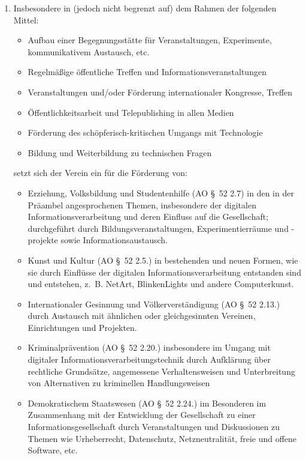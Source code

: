 \documentclass[10pt,a4paper]{scrartcl}
\begin{document}
\begin{enumerate}
\item Insbesondere in (jedoch nicht begrenzt auf) dem Rahmen der folgenden Mittel:
	\begin{itemize}
        \item Aufbau einer Begegnungsst{\"a}tte f{\"u}r Veranstaltungen, Experimente, kommunikativem Austausch, etc.
		\item Regelm{\"a}{\ss}ige {\"o}ffentliche Treffen und Informationsveranstaltungen
		\item Veranstaltungen und/oder F{\"o}rderung internationaler Kongresse, Treffen
		\item {\"O}ffentlichkeitsarbeit und Telepublishing in allen Medien
		\item F{\"o}rderung des sch{\"o}pferisch-kritischen Umgangs mit Technologie
        \item Bildung und Weiterbildung zu technischen Fragen
	\end{itemize}
	setzt sich der Verein ein f{\"u}r die F{\"o}rderung von:
	\begin{itemize}
		\item Erziehung, Volksbildung und Studentenhilfe (AO \S \ 52 2.7) in den in der Pr{\"a}ambel angesprochenen Themen,
			insbesondere der digitalen Informationsverarbeitung und deren Einfluss auf die Gesellschaft;
			durchgef{\"u}hrt durch Bildungsveranstaltungen, Experimentierr{\"a}ume und -projekte sowie Informationsaustausch.
		\item Kunst und Kultur (AO \S \ 52 2.5.) in bestehenden und neuen Formen, wie sie durch Einfl{\"u}sse der digitalen
			Informationsverarbeitung entstanden sind und entstehen, z.\, B. NetArt, BlinkenLights und andere Computerkunst.
        \item Internationaler Gesinnung und V{\"o}lkerverst{\"a}ndigung (AO \S \ 52 2.13.) durch Austausch mit {\"a}hnlichen oder gleichgesinnten
			Vereinen, Einrichtungen und Projekten.
		\item Kriminalpr{\"a}vention (AO \S \ 52 2.20.) insbesondere im Umgang mit digitaler Informationsverarbeitungstechnik durch
			Aufkl{\"a}rung {\"u}ber rechtliche Grunds{\"a}tze, angemessene Verhaltensweisen und Unterbreitung von Alternativen zu 
			kriminellen Handlungsweisen
		\item Demokratischem Staatswesen (AO \S \ 52 2.24.) im Besonderen im Zusammenhang mit der Entwicklung der Gesellschaft 
			zu einer Informationsgesellschaft durch Veranstaltungen und Diskussionen zu Themen wie Urheberrecht, Datenschutz, 
			Netzneutralit{\"a}t, freie und offene Software, etc.
	\end{itemize}
\end{enumerate}
%
%
\end{document}
